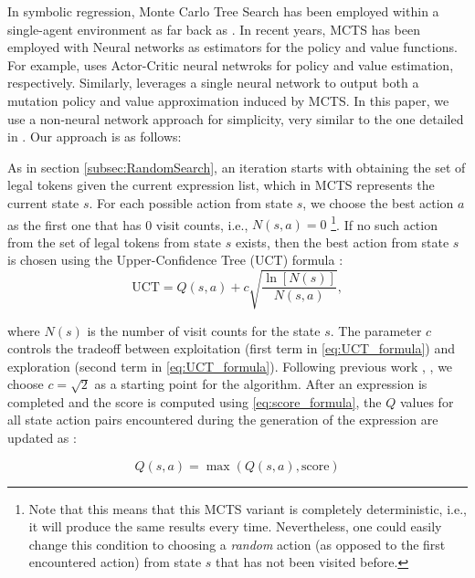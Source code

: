 \documentclass[12pt]{iopart}
\begin{document}
In symbolic regression, Monte Carlo Tree Search has been employed within a single-agent environment as far back as \cite{CazenaveMCTS}. In recent years, MCTS has been employed with Neural networks as estimators for the policy and value functions. For example, \cite{Lu2021} uses Actor-Critic neural netwroks for policy and value estimation, respectively. Similarly,  \cite{10.5555/3618408.3619047} leverages a single neural network to output both a mutation policy and value approximation induced by MCTS. In this paper, we use a non-neural network approach for simplicity, very similar to the one detailed in \cite{sun2023symbolic}.  Our approach is as follows:
\par As in section \ref{subsec:RandomSearch}, an iteration starts with obtaining the set of legal tokens given the current expression list, which in MCTS represents the current state $s$. For each possible action from state $s$, we choose the best action $a$ as the first one that has 0 visit counts, i.e., $N(s,a) = 0$ \footnote{Note that this means that this MCTS variant is completely deterministic, i.e., it will produce the same results every time. Nevertheless, one could easily change this condition to choosing a \emph{random} action (as opposed to the first encountered action) from state $s$ that has not been visited before. }. If no such action from the set of legal tokens from state $s$ exists, then the best action from state $s$ is chosen using the Upper-Confidence Tree (UCT) formula \cite{sun2023symbolic}:
\begin{equation}
\mathrm{UCT} = Q(s,a) + c\sqrt{\frac{\ln{[N(s)]}}{N(s,a)}}, \label{eq:UCT_formula}
\end{equation}

where $N(s)$ is the number of visit counts for the state $s$. The parameter $c$ controls the tradeoff between exploitation (first term in \ref{eq:UCT_formula}) and exploration (second term in \ref{eq:UCT_formula}). Following previous work \cite{Swiechowski2023} \cite{Auer2002}, \cite{kuleshov2014algorithms} \cite{10.1007/11871842_29}, we choose $c = \sqrt{2}$ as a starting point for the algorithm. After an expression is completed and the score is computed using \ref{eq:score_formula}, the $Q$ values for all state action pairs encountered during the generation of the expression are updated as \cite{sun2023symbolic}:

\begin{equation}
Q(s,a) = \max{\left(Q(s,a), \mathrm{score}\right)} \label{eq:update_Q_policy}
\end{equation}
\end{document}
